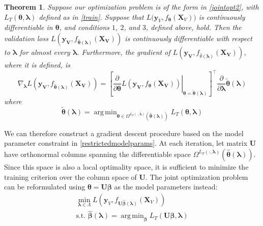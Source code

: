 \documentclass[12pt]{article}
\newtheorem{theorem}{Theorem}
\DeclareMathOperator*{\argmin}{arg\,min}
\begin{document}
\begin{theorem}
Suppose our optimization problem is of the form in \eqref{jointopt2}, with $L_T\left(\boldsymbol \theta, \boldsymbol{\lambda}\right)$ defined as in \eqref{train}. Suppose that $L \Big( \boldsymbol{y}_V, f_{\boldsymbol \theta}(\boldsymbol{X}_V)\Big)$ is continuously differentiable in $\boldsymbol \theta$, and conditions $1$, $2$, and $3$, defined above, hold. Then the validation loss $L(\boldsymbol{y_V}, f_{\hat {\boldsymbol\theta}(\boldsymbol{\lambda})}(\boldsymbol{X_V}))$ is continuously differentiable with respect to $\boldsymbol{\lambda}$ for almost every $\boldsymbol{\lambda}$. Furthermore, the gradient of $L(\boldsymbol{y_V}, f_{\hat \theta(\boldsymbol{\lambda})}(\boldsymbol{X_V}))$, where it is defined, is
\begin{equation}
\nabla_{\boldsymbol{\lambda}} L \left ( \boldsymbol{y_V}, f_{\hat {\boldsymbol \theta}(\boldsymbol{\lambda})}(\boldsymbol{X_V}) \right) =
\left [ \left .
\frac{\partial}{\partial \boldsymbol \theta} L(\boldsymbol{y_V}, f_{\boldsymbol \theta}(\boldsymbol{X_V}))
\right |_{\boldsymbol \theta=\tilde{\boldsymbol \theta}(\boldsymbol \lambda)} \right ]^\top
\frac{\partial}{\partial \boldsymbol{\lambda}} \tilde{\boldsymbol \theta}(\boldsymbol{\lambda})
\end{equation}
where
\begin{equation}
\tilde{\boldsymbol \theta}(\boldsymbol{\lambda}) = \argmin_{\boldsymbol \theta \in \Omega^{L_T(\cdot, \boldsymbol{\lambda})}(\hat {\boldsymbol \theta}(\boldsymbol{\lambda}))} L_T(\boldsymbol \theta , \boldsymbol{\lambda})
\label{restrictedmodelparams}
\end{equation}
\label{thethrm}
\end{theorem}

We can therefore construct a gradient descent procedure based on the model parameter constraint in \eqref{restrictedmodelparams}. At each iteration, let matrix $\boldsymbol U$ have orthonormal columns spanning the differentiable space $\Omega^{L_T(\cdot, \boldsymbol{\lambda})}(\hat {\boldsymbol \theta}(\boldsymbol{\lambda}))$. Since this space is also a local optimality space, it is sufficient to minimize the training criterion over the column space of $\boldsymbol U$. The joint optimization problem can be reformulated using $\boldsymbol{\theta} = \boldsymbol U \boldsymbol \beta$ as the model parameters instead:
\begin{equation}
\begin{array}{c}
\min_{\boldsymbol \lambda \in \Lambda} L(\boldsymbol y_V, f_{\boldsymbol U \hat{\boldsymbol \beta} (\boldsymbol \lambda) }(\boldsymbol X_V)) \\
\text{s.t. } \hat{\boldsymbol \beta} (\boldsymbol \lambda) =
\argmin_{\boldsymbol \beta}
L_T (\boldsymbol U \boldsymbol \beta, \boldsymbol{\lambda} )
\end{array}
\end{equation}
\end{document}
